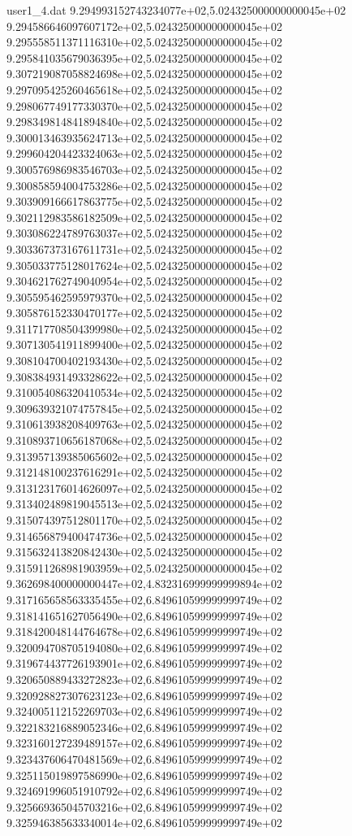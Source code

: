 \begin{filecontents}{user1_4.dat}
9.294993152743234077e+02,5.024325000000000045e+02
9.294586646097607172e+02,5.024325000000000045e+02
9.295558511371116310e+02,5.024325000000000045e+02
9.295841035679036395e+02,5.024325000000000045e+02
9.307219087058824698e+02,5.024325000000000045e+02
9.297095425260465618e+02,5.024325000000000045e+02
9.298067749177330370e+02,5.024325000000000045e+02
9.298349814841894840e+02,5.024325000000000045e+02
9.300013463935624713e+02,5.024325000000000045e+02
9.299604204423324063e+02,5.024325000000000045e+02
9.300576986983546703e+02,5.024325000000000045e+02
9.300858594004753286e+02,5.024325000000000045e+02
9.303909166617863775e+02,5.024325000000000045e+02
9.302112983586182509e+02,5.024325000000000045e+02
9.303086224789763037e+02,5.024325000000000045e+02
9.303367373167611731e+02,5.024325000000000045e+02
9.305033775128017624e+02,5.024325000000000045e+02
9.304621762749040954e+02,5.024325000000000045e+02
9.305595462595979370e+02,5.024325000000000045e+02
9.305876152330470177e+02,5.024325000000000045e+02
9.311717708504399980e+02,5.024325000000000045e+02
9.307130541911899400e+02,5.024325000000000045e+02
9.308104700402193430e+02,5.024325000000000045e+02
9.308384931493328622e+02,5.024325000000000045e+02
9.310054086320410534e+02,5.024325000000000045e+02
9.309639321074757845e+02,5.024325000000000045e+02
9.310613938208409763e+02,5.024325000000000045e+02
9.310893710656187068e+02,5.024325000000000045e+02
9.313957139385065602e+02,5.024325000000000045e+02
9.312148100237616291e+02,5.024325000000000045e+02
9.313123176014626097e+02,5.024325000000000045e+02
9.313402489819045513e+02,5.024325000000000045e+02
9.315074397512801170e+02,5.024325000000000045e+02
9.314656879400474736e+02,5.024325000000000045e+02
9.315632413820842430e+02,5.024325000000000045e+02
9.315911268981903959e+02,5.024325000000000045e+02
9.362698400000000447e+02,4.832316999999999894e+02
9.317165658563335455e+02,6.849610599999999749e+02
9.318141651627056490e+02,6.849610599999999749e+02
9.318420048144764678e+02,6.849610599999999749e+02
9.320094708705194080e+02,6.849610599999999749e+02
9.319674437726193901e+02,6.849610599999999749e+02
9.320650889433272823e+02,6.849610599999999749e+02
9.320928827307623123e+02,6.849610599999999749e+02
9.324005112152269703e+02,6.849610599999999749e+02
9.322183216889052346e+02,6.849610599999999749e+02
9.323160127239489157e+02,6.849610599999999749e+02
9.323437606470481569e+02,6.849610599999999749e+02
9.325115019897586990e+02,6.849610599999999749e+02
9.324691996051910792e+02,6.849610599999999749e+02
9.325669365045703216e+02,6.849610599999999749e+02
9.325946385633340014e+02,6.849610599999999749e+02

\end{filecontents}
